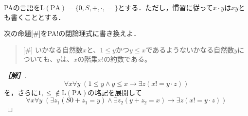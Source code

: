 \documentclass[uplatex,dvipdfmx]{jsarticle}
\begin{document}
\begin{notation*}
    PAの言語を$\mathrm{L(PA)}=\{0,S,+,\cdot,=\}$とする．ただし，慣習に従って$x\cdot y$は$xy$とも書くこととする．
\end{notation*}

\begin{problem}
    次の命題[\#]をPA!の閉論理式に書き換えよ．
    \begin{quote}
        [\#] いかなる自然数$x$と、$1\le y$かつ$y\le x$であるようないかなる自然数$y$についても、$y$は、$x$の階乗$x!$の約数である。
    \end{quote}
\end{problem}
\begin{proof}[\bf{［解］}]
    \[ \forall x\forall y\;(1\le y\land y\le x\to\exists z(x!=y\cdot z)) \]
    を，さらに$1,\le\notin\mathrm{L(PA)}$の略記を展開して
    \[ \forall x\forall y\;(\exists z_1(S0+z_1=y)\land\exists z_2(y+z_2=x)\to\exists z(x!=y\cdot z)) \]
\end{proof}
\end{document}
